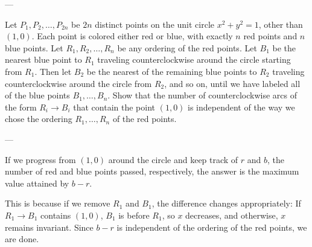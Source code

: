 
---

Let $P_1,P_2,\ldots,P_{2n}$ be $2n$ distinct points on the unit circle $x^2+y^2=1$, other than $(1,0)$. Each point is colored either red or blue, with exactly $n$ red points and $n$ blue points. Let $R_1,R_2,\ldots,R_n$ be any ordering of the red points. Let $B_1$ be the nearest blue point to $R_1$ traveling counterclockwise around the circle starting from $R_1$. Then let $B_2$ be the nearest of the remaining blue points to $R_2$ traveling counterclockwise around the circle from $R_2$, and so on, until we have labeled all of the blue points $B_1,\ldots,B_n$. Show that the number of counterclockwise arcs of the form $R_i\to B_i$ that contain the point $(1,0)$ is independent of the way we chose the ordering $R_1,\ldots,R_n$ of the red points.

---

If we progress from $(1,0)$ around the circle and keep track of $r$ and $b$, the number of red and blue points passed, respectively, the answer is the maximum value attained by $b-r$.

This is because if we remove $R_1$ and $B_1$, the difference changes appropriately: If $R_1\to B_1$ contains $(1,0)$, $B_1$ is before $R_1$, so $x$ decreases, and otherwise, $x$ remains invariant. Since $b-r$ is independent of the ordering of the red points, we are done.
